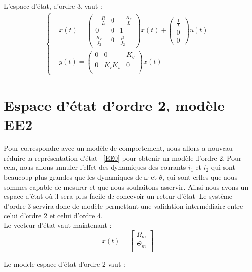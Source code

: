 \noindent L'espace d'état, d'ordre 3, vaut : 
\begin{align}
\label{EE0}
\left\lbrace
\begin{aligned}
&\dot{x}(t) = \begin{pmatrix}
-\frac{R}{L}	& 	     0 &   -\frac{K_e}{L}	\\
0&	0 & 1\\
\frac{K_c}{J_2}	&	0&	\frac{\mu}{J_2}
\end{pmatrix}x(t)+\begin{pmatrix}
\frac{1}{L}\\0\\0
\end{pmatrix}u(t)\\
&y(t) = \begin{pmatrix}
0&		0 & K_g	\\
0&		K_rK_s	&	0\\
\end{pmatrix}x(t)
\end{aligned}
\right.
\end{align}
\section{Espace d'état d'ordre 2, modèle EE2}
Pour correspondre avec un modèle de comportement, nous allons a nouveau réduire la représentation d'état ~\eqref{EE0} pour obtenir un modèle d'ordre 2. Pour cela, nous allons annuler l'effet des dynamiques des courants $i_1$ et $i_2$ qui sont beaucoup plus grandes que les dynamiques de $\omega$ et $\theta$, qui sont celles que nous sommes capable de mesurer et que nous souhaitons asservir. Ainsi nous avons un espace d'état o\`u il sera plus facile de concevoir un retour d'état. Le système d'ordre 3 servira donc de modèle permettant une validation intermédiaire entre celui d'ordre 2 et celui d'ordre 4.\\

\noindent Le vecteur d'état vaut maintenant : \begin{equation}
x(t)=\begin{bmatrix}
\Omega_m\\
\Theta_m\\
\end{bmatrix}
\end{equation}

\noindent Le modèle espace d'état d'ordre 2 vaut :\\

